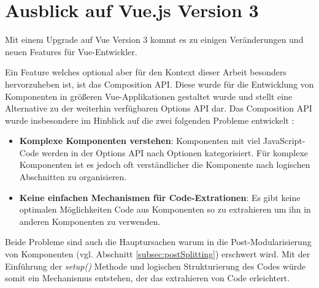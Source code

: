 \chapter{Ausblick auf Vue.js Version 3}
\label{cha:vue3}

Mit einem Upgrade auf Vue Version 3 kommt es zu einigen Veränderungen und neuen Features für Vue-Entwickler. 

Ein Feature welches optional aber für den Kontext dieser Arbeit besonders hervorzuheben ist, ist das Composition API. Diese wurde für die Entwicklung von Komponenten in größeren Vue-Applikationen gestaltet wurde und stellt eine Alternative zu der weiterhin verfügbaren Options API dar.
Das Composition API wurde insbesondere im Hinblick auf die zwei folgenden Probleme entwickelt \citep{Vue3DocsLogicReuse}: 

\begin{itemize}
  \item \textbf{Komplexe Komponenten verstehen}: Komponenten mit viel JavaScript-Code werden in der Options API nach Optionen kategorisiert. Für komplexe Komponenten ist es jedoch oft verständlicher die Komponente nach logischen Abschnitten zu organisieren.
  \item \textbf{Keine einfachen Mechanismen für Code-Extrationen}: Es gibt keine optimalen Möglichkeiten Code aus Komponenten so zu extrahieren um ihn in anderen Komponenten zu verwenden.
\end{itemize}

Beide Probleme sind auch die Hauptursachen warum in die Post-Modularisierung von Komponenten (vgl. Abschnitt \ref{subsec:postSplitting}) erschwert wird. Mit der Einführung der \textit{setup()} Methode und logischen Strukturierung des Codes würde somit ein Mechanismus entstehen, der das extrahieren von Code erleichtert.
